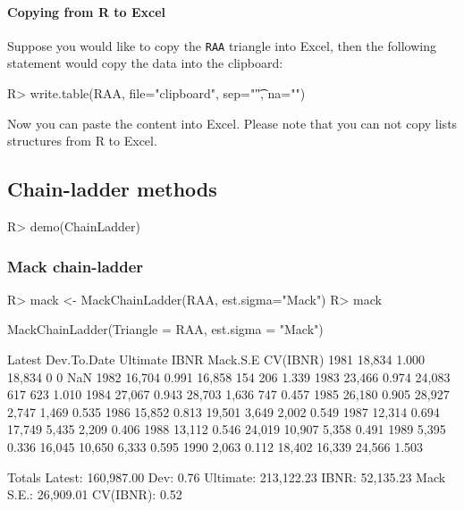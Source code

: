 \documentclass{article}
\begin{document}
\paragraph{Copying from R to Excel}
Suppose you would like to copy the \texttt{RAA} triangle into Excel,
then the following statement would copy the data into the clipboard:
\begin{Schunk}
\begin{Sinput}
R> write.table(RAA, file="clipboard", sep="\t", na="")
\end{Sinput}
\end{Schunk}
Now you can paste the content into Excel. Please note that you can not
copy lists structures from R to Excel. 

\subsection{Chain-ladder methods}
\begin{Schunk}
\begin{Sinput}
R> demo(ChainLadder)
\end{Sinput}
\end{Schunk}
\subsubsection{Mack chain-ladder}
\begin{Schunk}
\begin{Sinput}
R> mack <- MackChainLadder(RAA, est.sigma="Mack")
R> mack
\end{Sinput}
\begin{Soutput}
MackChainLadder(Triangle = RAA, est.sigma = "Mack")

     Latest Dev.To.Date Ultimate   IBNR Mack.S.E CV(IBNR)
1981 18,834       1.000   18,834      0        0      NaN
1982 16,704       0.991   16,858    154      206    1.339
1983 23,466       0.974   24,083    617      623    1.010
1984 27,067       0.943   28,703  1,636      747    0.457
1985 26,180       0.905   28,927  2,747    1,469    0.535
1986 15,852       0.813   19,501  3,649    2,002    0.549
1987 12,314       0.694   17,749  5,435    2,209    0.406
1988 13,112       0.546   24,019 10,907    5,358    0.491
1989  5,395       0.336   16,045 10,650    6,333    0.595
1990  2,063       0.112   18,402 16,339   24,566    1.503

               Totals
Latest:    160,987.00
Dev:             0.76
Ultimate:  213,122.23
IBNR:       52,135.23
Mack S.E.:  26,909.01
CV(IBNR):        0.52
\end{Soutput}
\end{Schunk}
\end{document}
